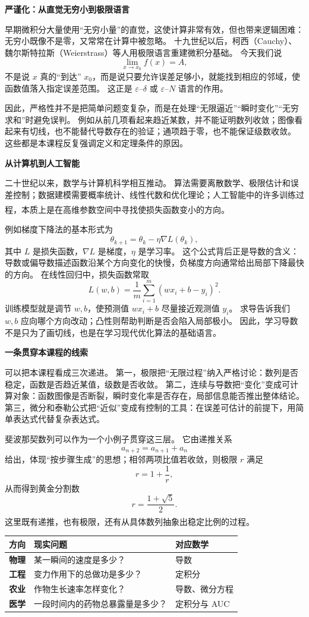 \documentclass[fontset=fandol]{ctexart}
\newcommand{\upcite}[1]{\textsuperscript{\textsuperscript{\cite{#1}}}}
\begin{document}
\textbf{严谨化：从直觉无穷小到极限语言}

早期微积分大量使用“无穷小量”的直觉，这使计算非常有效，但也带来逻辑困难：无穷小既像不是零，又常常在计算中被忽略。 十九世纪以后，柯西（Cauchy）、魏尔斯特拉斯（Weierstrass）等人用极限语言重建微积分基础。 今天我们说
\[
\lim_{x\to x_0}f(x)=A,
\]
不是说 $x$ 真的“到达” $x_0$，而是说只要允许误差足够小，就能找到相应的邻域，使函数值落入指定误差范围。 这正是 $\varepsilon$--$\delta$ 或 $\varepsilon$--$N$ 语言的作用。

因此，严格性并不是把简单问题变复杂，而是在处理“无限逼近”“瞬时变化”“无穷求和”时避免误判。 例如从前几项看起来趋近某数，并不能证明数列收敛；图像看起来有切线，也不能替代导数存在的验证；通项趋于零，也不能保证级数收敛。 这些都是本课程反复强调定义和定理条件的原因。

\textbf{从计算机到人工智能}

二十世纪以来，数学与计算机科学相互推动。 算法需要离散数学、极限估计和误差控制；数据建模需要概率统计、线性代数和优化理论；人工智能中的许多训练过程，本质上是在高维参数空间中寻找使损失函数变小的方向。\upcite{SEP-AI}

例如梯度下降法的基本形式为
\[
\theta_{k+1}=\theta_k-\eta\nabla L(\theta_k),
\]
其中 $L$ 是损失函数，$\nabla L$ 是梯度，$\eta$ 是学习率。 这个公式背后正是导数的含义：导数或偏导数描述函数沿某个方向变化的快慢，负梯度方向通常给出局部下降最快的方向。 在线性回归中，损失函数常取
\[
L(w,b)=\frac1m\sum _{i=1}^m(wx_i+b-y_i)^2.
\]
训练模型就是调节 $w,b$，使预测值 $wx_i+b$ 尽量接近观测值 $y_i$。 求导告诉我们 $w,b$ 应向哪个方向改动；凸性则帮助判断是否会陷入局部极小。 因此，学习导数不是只为了画切线，也是在学习现代优化算法的基础语言。

\textbf{一条贯穿本课程的线索}

可以把本课程看成三次递进。 第一，极限把“无限过程”纳入严格讨论：数列是否稳定，函数是否趋近某值，级数是否收敛。 第二，连续与导数把“变化”变成可计算对象：函数图像是否断裂，瞬时变化率是否存在，局部信息能否推出整体结论。 第三，微分和泰勒公式把“近似”变成有控制的工具：在误差可估计的前提下，用简单表达式代替复杂表达式。

斐波那契数列可以作为一个小例子贯穿这三层。 它由递推关系
\[
a_{n+2}=a_{n+1}+a_n
\]
给出，体现“按步骤生成”的思想；相邻两项比值若收敛，则极限 $r$ 满足
\[
r=1+\frac1r,
\]
从而得到黄金分割数
\[
r=\frac{1+\sqrt5}{2}.
\]
这里既有递推，也有极限，还有从具体数列抽象出稳定比例的过程。\upcite{MathWorldFib}

\begin{center}
\small
\begin{tabularx}{\textwidth}{>{\bfseries}p{1.4cm} X X}
\toprule
方向 & 现实问题 & 对应数学 \\
\midrule
物理 & 某一瞬间的速度是多少？ & 导数 \\
工程 & 变力作用下的总做功是多少？ & 定积分 \\
农业 & 作物生长速率怎样变化？ & 导数、微分方程 \\
医学 & 一段时间内的药物总暴露量是多少？ & 定积分与 AUC \\
\bottomrule
\end{tabularx}
\end{center}
\end{document}

